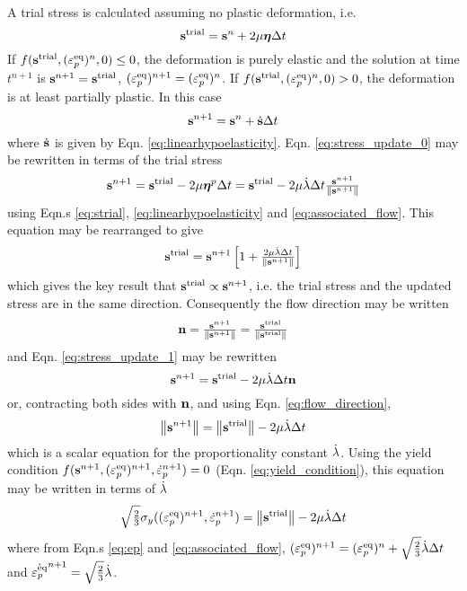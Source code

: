 A trial stress is calculated assuming no plastic deformation, i.e.
  \begin{equation}\label{eq:strial}
    {\ensuremath{\mathbf{s}}^{\text{trial}}} = \mathbf{s}^n + 2\mu\boldsymbol{\eta}\Delta t
  \end{equation}
If $f(\mathbf{s}^{\text{trial}},(\varepsilon_p^\text{eq})^n,0)\le0$, the deformation is purely
elastic and the solution at time $t^{n+1}$ is
$\mathbf{s}^{n+1}=\mathbf{s}^{\text{trial}}$, $(\varepsilon_p^\text{eq})^{n+1}=(\varepsilon_p^\text{eq})^n$.  If
$f(\mathbf{s}^{\text{trial}},(\varepsilon_p^\text{eq})^n,0)>0$, the deformation is at least
partially plastic.  In this case
  \begin{equation}\label{eq:stress_update_0}
    \mathbf{s}^{n+1} = \mathbf{s}^n + \dot{\mathbf{s}}\Delta t
  \end{equation}
where $\dot{\mathbf{s}}$ is given by Eqn. \ref{eq:linearhypoelasticity}.
Eqn. \ref{eq:stress_update_0} may be rewritten in terms of the trial
stress
  \begin{equation}\label{eq:stress_update_1}
    \mathbf{s}^{n+1} = \mathbf{s}^{\text{trial}} - 2\mu\boldsymbol{\eta}^p\Delta t = \mathbf{s}^{\text{trial}} - 2\mu\dot{\lambda}\Delta t \tfrac{\mathbf{s}^{n+1}}{\left\lVert\mathbf{s}^{n+1}\right\rVert}
  \end{equation}
using Eqn.s \ref{eq:strial}, \ref{eq:linearhypoelasticity} and
\ref{eq:associated_flow}.  This equation may be rearranged to give
  \begin{equation}
    \mathbf{s}^{\text{trial}} = \mathbf{s}^{n+1} \left[ 1 + \tfrac{2\mu\dot{\lambda}\Delta t}{\left\lVert\mathbf{s}^{n+1}\right\rVert}\right]
  \end{equation}
which gives the key result that $\mathbf{s}^{\text{trial}} \propto
\mathbf{s}^{n+1}$, i.e. the trial stress and the updated stress are in the
same direction.  Consequently the flow direction may be written
  \begin{equation}\label{eq:flow_direction}
    \mathbf{n}=\tfrac{\mathbf{s}^{n+1}}{\left\lVert\mathbf{s}^{n+1}\right\rVert}=\tfrac{\mathbf{s}^{\text{trial}}}{\left\lVert\mathbf{s}^{\text{trial}}\right\rVert}
  \end{equation}
and Eqn. \ref{eq:stress_update_1} may be rewritten
  \begin{equation}\label{eq:stress_update_2}
    \mathbf{s}^{n+1} = \mathbf{s}^{\text{trial}} - 2\mu\dot{\lambda}\Delta t \mathbf{n}
  \end{equation}
or, contracting both sides with $\mathbf{n}$, and using Eqn. \ref{eq:flow_direction},
  \begin{equation}
    \left\lVert\mathbf{s}^{n+1}\right\rVert = \left\lVert\mathbf{s}^{\text{trial}}\right\rVert - 2\mu\dot{\lambda}\Delta t
  \end{equation}
which is a scalar equation for the proportionality constant
$\dot{\lambda}$.  Using the yield condition
$f(\mathbf{s}^{n+1},(\varepsilon_p^\text{eq})^{n+1},\dot{\varepsilon}_{p}^{n+1})=0$
(Eqn. \ref{eq:yield_condition}), this equation may be written in terms
of $\dot{\lambda}$
  \begin{equation}\label{eq:stress_update_3}
     \sqrt{\tfrac{2}{3}}\sigma_y((\varepsilon_p^\text{eq})^{n+1},\dot{\varepsilon}_{p}^{n+1}) = \left\lVert\mathbf{s}^{\text{trial}}\right\rVert - 2\mu\dot{\lambda}\Delta t
  \end{equation}
where from Eqn.s \ref{eq:ep} and \ref{eq:associated_flow},
$(\varepsilon_p^\text{eq})^{n+1}=(\varepsilon_p^\text{eq})^n+\sqrt{\frac{2}{3}}\dot{\lambda}\Delta t$ and $\dot{\varepsilon_p^\text{eq}}^{n+1}=\sqrt{\tfrac{2}{3}}\dot{\lambda}$.

